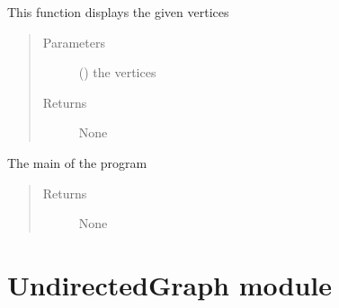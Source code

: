 \documentclass[letterpaper,10pt,english]{sphinxmanual}
\begin{document}

\begin{fulllineitems}
\label{\detokenize{UI:UI.display_vertices}}
This function displays the given vertices
\begin{quote}\begin{description}
\item[{Parameters}] \leavevmode
{} () \textendash{} the vertices

\item[{Returns}] \leavevmode
None

\end{description}\end{quote}

\end{fulllineitems}


\begin{fulllineitems}
\label{\detokenize{UI:UI.main}}
The main of the program
\begin{quote}\begin{description}
\item[{Returns}] \leavevmode
None

\end{description}\end{quote}

\end{fulllineitems}



\section{UndirectedGraph module}
\label{\detokenize{UndirectedGraph:module-UndirectedGraph}}\label{\detokenize{UndirectedGraph:undirectedgraph-module}}\label{\detokenize{UndirectedGraph::doc}}
\end{document}
